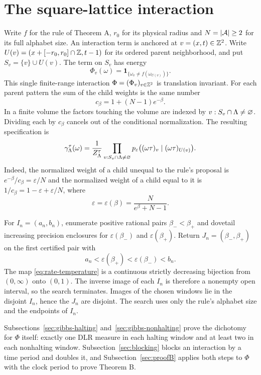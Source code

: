 \section{The square-lattice interaction}\label{sec:gibbs}

Write \(f\) for the rule of Theorem A, \(r_0\) for its physical radius and \(N=|\mathcal A|\ge2\) for its full alphabet size. An interaction term is anchored at \(v=(x,t)\in\mathbb Z^2\). Write \(U(v)=(x+[-r_0,r_0]\cap\mathbb Z,t-1)\) for its ordered parent neighborhood, and put \(S_v=\{v\}\cup U(v)\). The term on \(S_v\) has energy
\[
\Phi_v(\omega)=\mathbf 1_{\{\omega_v\ne f(\omega_{U(v)})\}}.
\]
This single finite-range interaction \(\Phi=(\Phi_v)_{v\in\mathbb Z^2}\) is translation invariant. For each parent pattern the sum of the child weights is the same number
\[
c_\beta=1+(N-1)e^{-\beta}.
\]
In a finite volume the factors touching the volume are indexed by \(v:S_v\cap\Lambda\ne\varnothing\). Dividing each by \(c_\beta\) cancels out of the conditional normalization. The resulting specification is
\begin{equation}\label{eq:spec}
\gamma^\tau_\Lambda(\omega)=\frac{1}{Z^\tau_\Lambda}
\prod_{v:S_v\cap\Lambda\ne\varnothing}
p_\varepsilon\bigl((\omega\tau)_v\mid(\omega\tau)_{U(v)}\bigr).
\end{equation}
Indeed, the normalized weight of a child unequal to the rule's proposal is \(e^{-\beta}/c_\beta=\varepsilon/N\) and the normalized weight of a child equal to it is \(1/c_\beta=1-\varepsilon+\varepsilon/N\), where
\begin{equation}\label{eq:rate-temperature}
\varepsilon=\varepsilon(\beta)=\frac{N}{e^\beta+N-1}.
\end{equation}

For \(I_n=(a_n,b_n)\), enumerate positive rational pairs \(\beta_-<\beta_+\) and dovetail increasing precision enclosures for \(\varepsilon(\beta_-)\) and \(\varepsilon(\beta_+)\). Return \(J_n=(\beta_-,\beta_+)\) on the first certified pair with
\[
a_n<\varepsilon(\beta_+)<\varepsilon(\beta_-)<b_n.
\]
The map \eqref{eq:rate-temperature} is a continuous strictly decreasing bijection from \((0,\infty)\) onto \((0,1)\). The inverse image of each \(I_n\) is therefore a nonempty open interval, so the search terminates. Images of the chosen windows lie in the disjoint \(I_n\), hence the \(J_n\) are disjoint. The search uses only the rule's alphabet size and the endpoints of \(I_n\).

Subsections~\ref{sec:gibbs-halting} and~\ref{sec:gibbs-nonhalting} prove the dichotomy for \(\Phi\) itself: exactly one DLR measure in each halting window and at least two in each nonhalting window. Subsection~\ref{sec:blocking} blocks an interaction by a time period and doubles it, and Subsection~\ref{sec:proofB} applies both steps to \(\Phi\) with the clock period to prove Theorem B.

